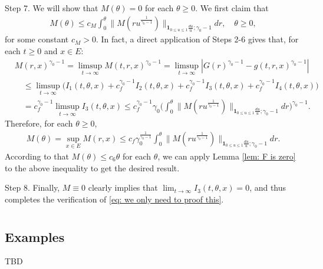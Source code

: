 \documentclass[12pt,a4paper]{amsart}
\theoremstyle{definition}
\numberwithin{equation}{section}
\begin{document}
Step 7. We will show that $M(\theta) = 0$ for each $\theta \geq 0$.
We first claim that
\begin{align}
	M(\theta)
	\leq c_M\int_0^\theta  \big\| M(r u^{\frac{1}{\gamma_0 - 1}}) \big\|_{\mathbf 1_{0\leq u\leq 1}\frac{du}{u};\gamma_0 - 1}  dr ,
	\quad \theta \geq 0,
\end{align}
for some constant $c_M > 0$.
In fact, a direct application of Steps 2-6 gives that, for each $t\geq 0$ and $x\in E$:
\begin{align}
	& M(r,x)^{\gamma_0 - 1}
	= \limsup_{t\to \infty} M(t,r,x)^{\gamma_0 - 1}
	= \limsup_{t\to \infty}|G(r)^{\gamma_0 - 1} - g(t,r,x)^{\gamma_0 - 1}|
	\\ & \quad \leq \limsup_{t\to \infty} \big( I_1(t,\theta,x) +c^{\gamma_0 - 1}_f I_2(t,\theta,x) +c^{\gamma_0 - 1}_f I_3(t,\theta,x) + c^{\gamma_0 - 1}_f I_4(t,\theta,x) \big)
	\\ & \quad = c_f^{\gamma_0 - 1} \limsup_{t\to \infty} I_3(t,\theta ,x)
       \leq c_f^{\gamma_0 - 1} \gamma_0 \Big(  \int_0^\theta  \big\| M(r u^{\frac{1}{\gamma_0 - 1}}) \big\|_{\mathbf 1_{0\leq u\leq 1}\frac{du}{u};\gamma_0 - 1}  dr\Big)^{\gamma_0 - 1}.
\end{align}
Therefore, for each $\theta \geq 0$,
\begin{align}
	M(\theta)
	= \sup_{x\in E}  M(r,x)
	\leq c_f \gamma_0^{\frac{1}{\gamma_0 - 1}} \int_0^\theta  \big\| M(r u^{\frac{1}{\gamma_0 - 1}}) \big\|_{\mathbf 1_{0\leq u\leq 1}\frac{du}{u};\gamma_0 - 1}  dr.
\end{align}
According to that $M(\theta) \leq c_6 \theta$ for each $\theta$, we can apply Lemma \ref{lem: F is zero} to the above inequality to get the desired result.

Step 8. Finally, $M \equiv 0$ clearly implies that $\lim_{t\to \infty} I_3(t,\theta, x) = 0$, and thus completes the verification of \eqref{eq: we only need to proof this}.


\appendix
\section{}
\subsection{Examples}
TBD
\end{document}
